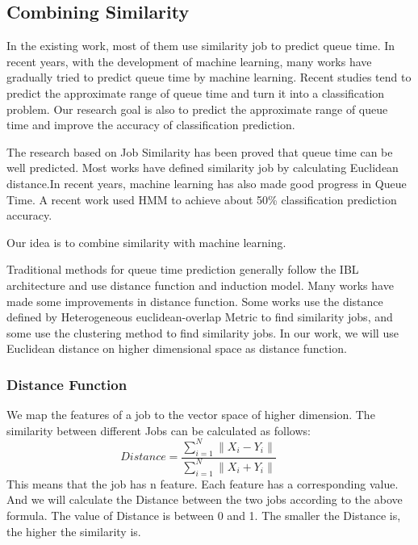 \documentclass[conference,compsoc]{IEEEtran}
\begin{document}
\subsection{Combining Similarity}

	In the existing work, most of them use similarity job to predict queue time. In recent years, with the development of machine learning, many works have gradually tried to predict queue time by machine learning. Recent studies tend to predict the approximate range of queue time and turn it into a classification problem. Our research goal is also to predict the approximate range of queue time and improve the accuracy of classification prediction.

	The research based on Job Similarity has been proved that queue time can be well predicted. Most works\cite{kapadia1999predictive}\cite{li2005efficient} have defined similarity job by calculating Euclidean distance.In recent years, machine learning has also made good progress in Queue Time. A recent work\cite{park2022queue} used HMM to achieve about 50\% classification prediction accuracy.
	
	Our idea is to combine similarity with machine learning.

	Traditional methods for queue time prediction generally follow the IBL\cite{kapadia1999predictive} architecture and use distance function and induction model. Many works have made some improvements in distance function. Some works use the distance defined by Heterogeneous euclidean-overlap Metric\cite{wilson1997improved} to find similarity jobs, and some use the clustering\cite{nurmi2007qbets}\cite{murali2016qespera} method to find similarity jobs. In our work, we will use Euclidean distance on higher dimensional space as  distance function.
	
\subsubsection{Distance Function}

	We map the features of a job to the vector space of higher dimension. The similarity between different Jobs can be calculated as follows:
	$$
	Distance = \frac{\sum\limits_{i=1}^N{\|X_i - Y_i\|}}{\sum\limits_{i=1}^N{\|X_i + Y_i\|}}\qquad
	$$
	This means that the job has n feature. Each feature has a corresponding value. And we will calculate the Distance between the two jobs according to the above formula. The value of Distance is between 0 and 1. The smaller the Distance is, the higher the similarity is.
\end{document}
